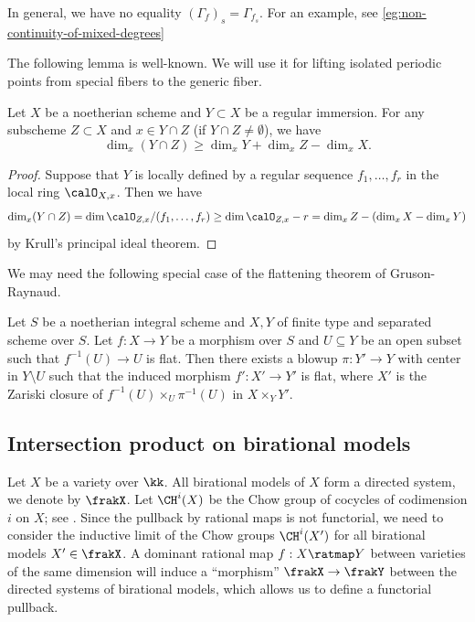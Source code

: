 \begin{remark}
	In general, we have no equality $(\Gamma_f)_s = \Gamma_{f_s}$.
	For an example, see \cref{eg:non-continuity-of-mixed-degrees}
\end{remark}

The following lemma is well-known.
We will use it for lifting isolated periodic points from special fibers to the generic fiber.
\begin{lemma}\label{lem:intersection_dimension_estimate}
	Let $X$ be a noetherian scheme and $Y \subset X$ be a regular immersion.
	For any subscheme $Z \subset X$ and $x \in Y \cap Z$ (if $Y \cap Z \neq \emptyset$), we have
	\[ \dim_x (Y \cap Z) \geq \dim_x Y + \dim_x Z - \dim_x X. \]
\end{lemma}
\begin{proof}
	Suppose that $Y$ is locally defined by a regular sequence $f_1, \dots, f_r$ in the local ring $\calO_{X,x}$.
	Then we have
	\[ \dim_x (Y \cap Z) = \dim \calO_{Z,x} / (f_1, \dots, f_r) \geq \dim \calO_{Z,x} - r = \dim_x Z - (\dim_x X - \dim_x Y) \]
	by Krull's principal ideal theorem.
\end{proof}

We may need the following special case of the flattening theorem of Gruson-Raynaud.
\begin{theorem}\label{thm:Gruson-Raynaud_flattening}
	Let $S$ be a noetherian integral scheme and $X,Y$ of finite type and separated scheme over $S$.
	Let $f: X \to Y$ be a morphism over $S$ and $U \subseteq Y$ be an open subset such that $f^{-1}(U) \to U$ is flat.
	Then there exists a blowup $\pi: Y' \to Y$ with center in $Y \setminus U$ such that the induced morphism $f': X' \to Y'$ is flat, where $X'$ is the Zariski closure of $f^{-1}(U) \times_U \pi^{-1}(U)$ in $X \times_Y Y'$.
\end{theorem}




\subsection{Intersection product on birational models}\label{subsec:intersection_product_on_birational_models}

Let $X$ be a variety over $\kk$.
All birational models of $X$ form a directed system, we denote by $\frakX$.
Let $\CH^i(X)$ be the Chow group of cocycles of codimension $i$ on $X$; see \cite[Chapter 17]{Fulton13Intersection}.
Since the pullback by rational maps is not functorial, we need to consider the inductive limit of the Chow groups $\CH^i(X')$ for all birational models $X' \in \frakX$.
A dominant rational map $f: X \ratmap Y$ between varieties of the same dimension will induce a ``morphism'' $\frakX \to \frakY$ between the directed systems of birational models, which allows us to define a functorial pullback.

